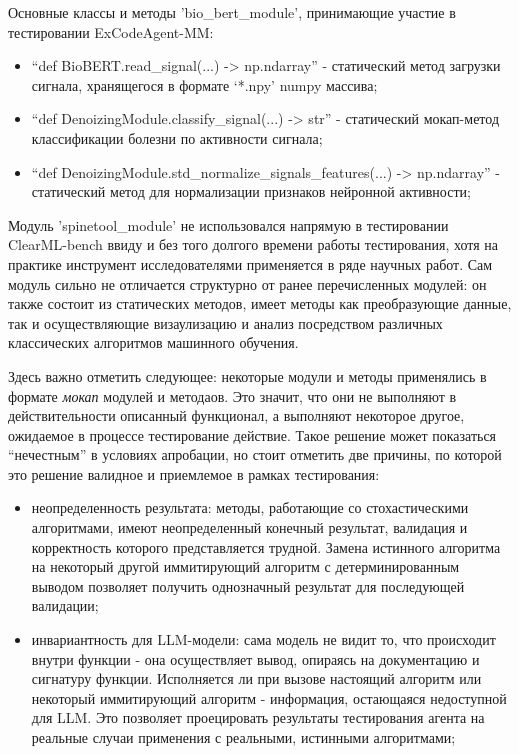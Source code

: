 Основные классы и методы 'bio\_bert\_module', принимающие участие в тестировании ExCodeAgent-MM:
\begin{itemize}
	\item ``def BioBERT.read\_signal(...) -> np.ndarray'' - статический метод загрузки
сигнала, хранящегося в формате `*.npy' numpy массива;
	\item ``def DenoizingModule.classify\_signal(...) -> str'' - статический мокап-метод классификации
болезни по активности сигнала;
	\item ``def DenoizingModule.std\_normalize\_signals\_features(...) -> np.ndarray'' - статический 
метод для нормализации признаков нейронной активности;
\end{itemize}

Модуль 'spinetool\_module' не использовался напрямую в тестировании ClearML-bench ввиду и без того 
долгого времени работы тестирования, хотя на практике инструмент исследователями применяется в ряде
научных работ. 
Сам модуль сильно не отличается структурно от ранее перечисленных модулей: 
он также состоит из статических методов, имеет методы как преобразующие данные, так и осуществляющие
визаулизацию и анализ посредством различных классических алгоритмов машинного обучения.

Здесь важно отметить следующее: некоторые модули и методы применялись в формате \textit{мокап} 
модулей и методаов. Это значит, что они не выполняют в действительности описанный функционал, 
а выполняют некоторое другое, ожидаемое в процессе тестирование действие.
Такое решение может показаться ``нечестным'' в условиях апробации, но стоит отметить две причины, 
по которой это решение валидное и приемлемое в рамках тестирования:
\begin{itemize}
	\item неопределенность результата: методы, работающие со стохастическими алгоритмами, 
имеют неопределенный конечный результат, валидация и корректность которого представляется трудной. 
Замена истинного алгоритма на некоторый другой иммитирующий алгоритм с детерминированным 
выводом позволяет получить однозначный результат для последующей валидации;
	\item инвариантность для LLM-модели: сама модель не видит то, что происходит внутри функции - она 
осуществляет вывод, опираясь на документацию и сигнатуру функции. Исполняется ли при вызове настоящий
алгоритм или некоторый иммитирующий алгоритм - информация, остающаяся недоступной для LLM. Это позволяет 
проецировать результаты тестирования агента на реальные случаи применения с реальными, истинными 
алгоритмами;
\end{itemize}

